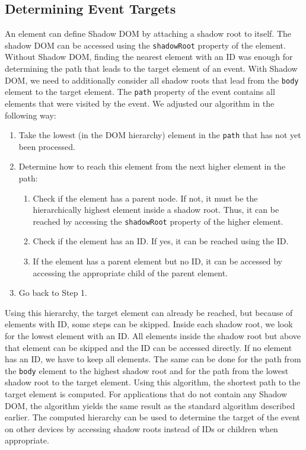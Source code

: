 \subsection{Determining Event Targets}

An element can define Shadow DOM by attaching a shadow root to itself. The shadow DOM can be accessed using the \lstinline|shadowRoot| property of the element. Without Shadow DOM, finding the nearest element with an ID was enough for determining the path that leads to the target element of an event. With Shadow DOM, we need to additionally consider all shadow roots that lead from the \lstinline|body| element to the target element. The \lstinline|path| property of the event contains all elements that were visited by the event. We adjusted our algorithm in the following way:
\begin{enumerate}
	\item Take the lowest (in the DOM hierarchy) element in the \lstinline|path| that has not yet been processed.
	\item Determine how to reach this element from the next higher element in the path:
	\begin{enumerate}
		\item Check if the element has a parent node. If not, it must be the hierarchically highest element inside a shadow root. Thus, it can be reached by accessing the \lstinline|shadowRoot| property of the higher element.
		\item Check if the element has an ID. If yes, it can be reached using the ID.
		\item If the element has a parent element but no ID, it can be accessed by accessing the appropriate child of the parent element.
	\end{enumerate}
	\item Go back to Step 1.
\end{enumerate}
Using this hierarchy, the target element can already be reached, but because of elements with ID, some steps can be skipped. Inside each shadow root, we look for the lowest element with an ID. All elements inside the shadow root but above that element can be skipped and the ID can be accessed directly. If no element has an ID, we have to keep all elements. The same can be done for the path from the \lstinline|body| element to the highest shadow root and for the path from the lowest shadow root to the target element. Using this algorithm, the shortest path to the target element is computed. For applications that do not contain any Shadow DOM, the algorithm yields the same result as the standard algorithm described earlier. The computed hierarchy can be used to determine the target of the event on other devices by accessing shadow roots instead of IDs or children when appropriate.

